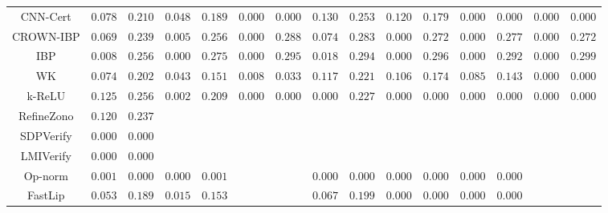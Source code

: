 \begin{table*}
{\begin{tabular}{c|c|c|c|c|c|c|c|c|c|c|c|c|c|c}
     CNN-Cert &       $0.078$ &       $0.210$ &       $0.048$ &       $0.189$ &       $0.000$ &       $0.000$ &       $0.130$ &       $0.253$ &       $0.120$ &       $0.179$ &       $0.000$ &       $0.000$ &       $0.000$ &       $0.000$ \\
    CROWN-IBP &       $0.069$ &       $0.239$ &       $0.005$ &       $0.256$ &       $0.000$ &       $0.288$ &       $0.074$ &       $0.283$ &       $0.000$ &       $0.272$ &       $0.000$ &       $0.277$ &       $0.000$ &       $0.272$ \\
          IBP &       $0.008$ &       $0.256$ &       $0.000$ &       $0.275$ &       $0.000$ &       $0.295$ &       $0.018$ &       $0.294$ &       $0.000$ &       $0.296$ &       $0.000$ &       $0.292$ &       $0.000$ &       $0.299$ \\
           WK &       $0.074$ &       $0.202$ &       $0.043$ &       $0.151$ &       $0.008$ &       $0.033$ &       $0.117$ &       $0.221$ &       $0.106$ &       $0.174$ &       $0.085$ &       $0.143$ &       $0.000$ &       $0.000$ \\
       k-ReLU &       $0.125$ &       $0.256$ &       $0.002$ &       $0.209$ &       $0.000$ &       $0.000$ &       $0.000$ &       $0.227$ &       $0.000$ &       $0.000$ &       $0.000$ &       $0.000$ &       $0.000$ &       $0.000$ \\
   RefineZono &       $0.120$ &       $0.237$ &               &               &               &               &               &               &               &               &               &               &               &               \\
    SDPVerify &       $0.000$ &       $0.000$ &               &               &               &               &               &               &               &               &               &               &               &               \\
    LMIVerify &       $0.000$ &       $0.000$ &               &               &               &               &               &               &               &               &               &               &               &               \\
      Op-norm &       $0.001$ &       $0.000$ &       $0.000$ &       $0.001$ &               &               &       $0.000$ &       $0.000$ &       $0.000$ &       $0.000$ &       $0.000$ &       $0.000$ &               &               \\
      FastLip &       $0.053$ &       $0.189$ &       $0.015$ &       $0.153$ &               &               &       $0.067$ &       $0.199$ &       $0.000$ &       $0.000$ &       $0.000$ &       $0.000$ &               &               \\

\end{tabular}}
\end{table*}

